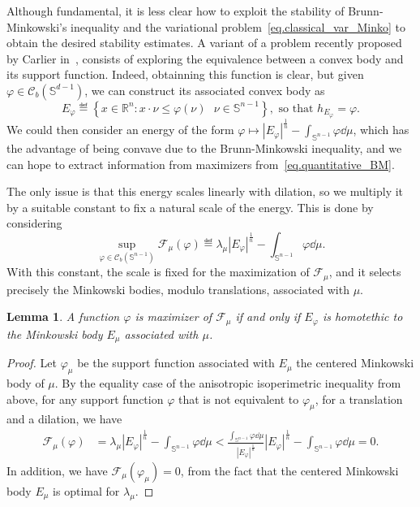 \documentclass[a4paper, 10pt, twoside]{amsart}
\numberwithin{equation}{section}
\newcommand{\lemmname}{Lemma}
\theoremstyle{plain}
\newtheorem{lemma}[theorem]{\lemmname}
\theoremstyle{definition}
\begin{document}
Although fundamental, it is less clear how to exploit the stability of Brunn-Minkowski's inequality and the variational problem~\eqref{eq.classical_var_Minko} to obtain the desired stability estimates. A variant of a problem recently proposed by Carlier in~\cite{carlier2004theorem}, consists of exploring the equivalence between a convex body and its support function. Indeed, obtainning this function is clear, but given $\varphi \in \mathscr{C}_b(\mathbb{S}^{d-1})$, we can construct its associated convex body as 
\begin{equation}
    E_\varphi 
    \eqdef \left\{
        x \in \mathbb{R}^n : x\cdot \nu \le \varphi(\nu) 
        \text{ } \nu \in \mathbb{S}^{n-1}
    \right\}, 
    \text{ so that } 
    h_{E_\varphi} = \varphi.
\end{equation}
We could then consider an energy of the form $\displaystyle \varphi \mapsto |E_\varphi|^{\frac{1}{n}} - \int_{\mathbb{S}^{n-1}} \varphi \dd \mu$, which has the advantage of being convave due to the Brunn-Minkowski inequality, and we can hope to extract information from maximizers from~\eqref{eq.quantitative_BM}. 

The only issue is that this energy scales linearly with dilation, so we multiply it by a suitable constant to fix a natural scale of the energy. This is done by considering
\begin{equation}\label{eq.minko_energy_fixed_scale}
    \sup_{\varphi \in \mathscr{C}_b(\mathbb{S}^{n-1})} 
    \mathscr{F}_\mu(\varphi) 
    \eqdef 
    \lambda_\mu
    {|E_\varphi|}^{\frac{1}{n}}
    -
    \int_{\mathbb{S}^{n-1}} \varphi \dd \mu. 
\end{equation}
With this constant, the scale is fixed for the maximization of $\mathscr{F}_\mu$, and it selects precisely the Minkowski bodies, modulo translations, associated with $\mu$. 

\begin{lemma}\label{lemma.maxi_Fmu}
    A function $\varphi$ is maximizer of $\mathscr{F}_\mu$ if and only if $E_{\varphi}$ is homotethic to the Minkowski body $E_\mu$ associated with $\mu$. 
\end{lemma}
\begin{proof}
    Let $\varphi_\mu$ be the support function associated with $E_\mu$ the centered Minkowski body of $\mu$. By the equality case of the anisotropic isoperimetric inequality from above, for any support function $\varphi$ that is not equivalent to $\varphi_\mu$, for a translation and a dilation, we have 
    \begin{align*}
        \mathscr{F}_\mu(\varphi)
        &= 
        \lambda_\mu {|E_\varphi|}^{\frac{1}{n}}
        - 
        \int_{\mathbb{S}^{n-1}} \varphi \dd \mu 
        <
        \frac{\displaystyle
            \int_{\mathbb{S}^{n-1}} \varphi \dd \mu
        }{{|E_\varphi|}^{\frac{1}{n}}} {|E_\varphi|}^{\frac{1}{n}} 
        - 
        \int_{\mathbb{S}^{n-1}} \varphi \dd \mu = 0. 
    \end{align*}
    In addition, we have $\mathscr{F}_{\mu}(\varphi_\mu) = 0$, from the fact that the centered Minkowski body $E_\mu$ is optimal for $\lambda_\mu$. 
\end{proof}
\end{document}
